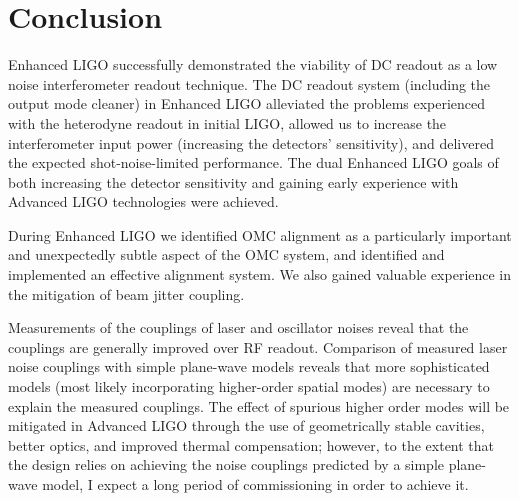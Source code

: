 \chapter{Conclusion}
\label{conclusion}

Enhanced LIGO successfully demonstrated the viability of DC readout as
a low noise interferometer readout technique.  The DC readout system
(including the output mode cleaner) in Enhanced LIGO alleviated the
problems experienced with the heterodyne readout in initial LIGO,
allowed us to increase the interferometer input power (increasing the
detectors' sensitivity), and delivered the expected shot-noise-limited
performance.  The dual Enhanced LIGO goals of both increasing the
detector sensitivity and gaining early experience with Advanced LIGO
technologies were achieved.

During Enhanced LIGO we identified OMC alignment as a particularly
important and unexpectedly subtle aspect of the OMC system, and
identified and implemented an effective alignment system.  We also
gained valuable experience in the mitigation of beam jitter coupling.

Measurements of the couplings of laser and oscillator noises reveal
that the couplings are generally improved over RF readout.  Comparison
of measured laser noise couplings with simple plane-wave models
reveals that more sophisticated models (most likely incorporating
higher-order spatial modes) are necessary to explain the measured
couplings.  The effect of spurious higher order modes will be
mitigated in Advanced LIGO through the use of geometrically stable
cavities, better optics, and improved thermal compensation; however,
to the extent that the design relies on achieving the noise couplings
predicted by a simple plane-wave model, I expect a long period of
commissioning in order to achieve it.

